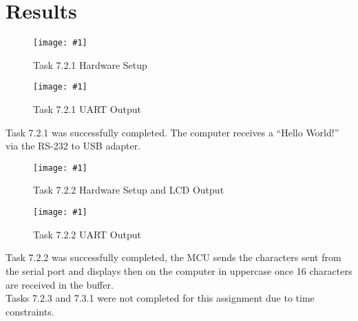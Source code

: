 \documentclass[journal]{IEEEtran}
\newcommand\createfigure[2]{
  \begin{figure}[H]
    \centering \texttt{[image: \#1]}
    \caption{#2}
  \end{figure}}
\begin{document}
\section{Results}
\createfigure{./Figures/7.2.1-1.jpg}{Task 7.2.1 Hardware Setup}
\createfigure{./Figures/7.2.1-2.jpg}{Task 7.2.1 UART Output}
Task 7.2.1 was successfully completed. The computer receives a ``Hello World!'' via the RS-232 to USB adapter.
\createfigure{./Figures/7.2.2-1.jpg}{Task 7.2.2 Hardware Setup and LCD Output}
\createfigure{./Figures/7.2.2-2.jpg}{Task 7.2.2 UART Output}
Task 7.2.2 was successfully completed, the MCU sends the characters sent from the serial port and displays then on the computer in uppercase once 16 characters are received in the buffer.\\
Tasks 7.2.3 and 7.3.1 were not completed for this assignment due to time constraints.
\nocite{rojasEmbeddedSystemsDesign2016}
\nocite{LCDControllerDatasheets}


\end{document}
